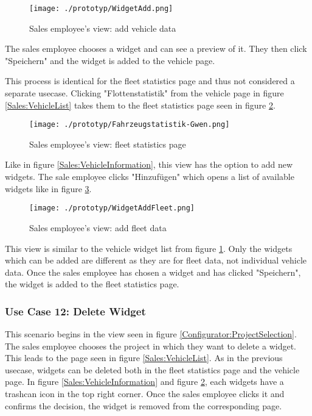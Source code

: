 \begin{figure}[ht]
  \centering
  \texttt{[image: ./prototyp/WidgetAdd.png]}
  \caption{Sales employee's view: add vehicle \gls{data}}
  \label{Sales:AddWidget}
\end{figure}

The sales employee chooses a \gls{widget} and can see a preview of it. They then click "Speichern" and the \gls{widget} is added to the vehicle page.

This process is identical for the fleet statistics page and thus not considered a separate \gls{usecase}. Clicking "Flottenstatistik" from the vehicle page in figure \ref{Sales:VehicleList} takes them to the fleet statistics page seen in figure \ref{Sales:Fleet}.

\begin{figure}[ht]
  \centering
  \texttt{[image: ./prototyp/Fahrzeugstatistik-Gwen.png]}
  \caption{Sales employee's view: fleet statistics page}
  \label{Sales:Fleet}
\end{figure}

Like in figure \ref{Sales:VehicleInformation}, this view has the option to add new \glspl{widget}. The sale employee clicks "Hinzufügen" which opens a list of available \glspl{widget} like in figure \ref{Sales:FleetWidget}.

\begin{figure}[ht]
  \centering
  \texttt{[image: ./prototyp/WidgetAddFleet.png]}
  \caption{Sales employee's view: add fleet \gls{data}}
  \label{Sales:FleetWidget}
\end{figure}

This view is similar to the vehicle \gls{widget} list from figure \ref{Sales:AddWidget}. Only the \glspl{widget} which can be added are different as they are for fleet data, not individual vehicle data. Once the sales employee has chosen a \gls{widget} and has clicked "Speichern", the \gls{widget} is added to the fleet statistics page.


\subsubsection{Use Case 12: Delete Widget}
This scenario begins in the view seen in figure \ref{Configurator:ProjectSelection}. The sales employee chooses the project in which they want to delete a widget. This leads to the page seen in figure \ref{Sales:VehicleList}. As in the previous \gls{usecase}, \glspl{widget} can be deleted both in the fleet statistics page and the vehicle page. In figure \ref{Sales:VehicleInformation} and figure \ref{Sales:Fleet}, each \glspl{widget} have a trashcan icon in the top right corner. Once the sales employee clicks it and confirms the decision, the \gls{widget} is removed from the corresponding page.


